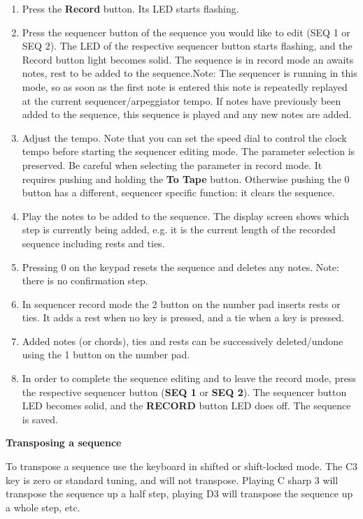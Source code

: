 \begin{enumerate}
  \item Press the \textbf{Record} button. Its LED starts flashing.
  \item Press the sequencer button of the sequence you would like to edit (SEQ 1 or SEQ 2). The LED of the respective sequencer button starts flashing, and the Record button light becomes solid. The sequence is in record mode an awaits notes, rest to be added to the sequence.Note: The sequencer is running in this mode, so as soon as the first note is entered this note is repeatedly replayed at the current sequencer/arpeggiator tempo. If notes have previously been added to the sequence, this sequence is played and any new notes are added. 
  \item Adjust the tempo. Note that you can set the speed dial to control the clock tempo before starting the sequencer editing mode. The parameter selection is preserved. Be careful when selecting the parameter in record mode. It requires pushing and holding  the \textbf{To Tape} button. Otherwise pushing the 0 button has a different, sequencer specific function: it clears the sequence.  
  \item Play the notes to be added to the sequence. The display screen shows which step is currently being added, e.g. it is the current length of the recorded sequence including rests and ties.
  \item Pressing 0 on the keypad resets the sequence and deletes any notes. Note: there is no confirmation step. 
  \item In sequencer record mode the 2 button on the number pad inserts rests or ties. It adds a rest when no key is pressed, and a tie when a key is pressed.
  \item Added notes (or chords), ties and rests can be successively deleted/undone using the 1 button on the number pad. 
  \item In order to complete the sequence editing and to leave the record mode, press the respective sequencer button (\textbf{SEQ 1} or \textbf{SEQ 2}). The sequencer button LED becomes solid, and the \textbf{RECORD} button LED does off. The sequence is saved. 
\end{enumerate}

\textbf{Transposing a  sequence}

To transpose a sequence use the keyboard in shifted or shift-locked mode. The C3 key is zero or standard tuning, and will not transpose. Playing C sharp 3 will transpose the sequence up a half step, playing D3 will transpose the sequence up a whole step, etc.
